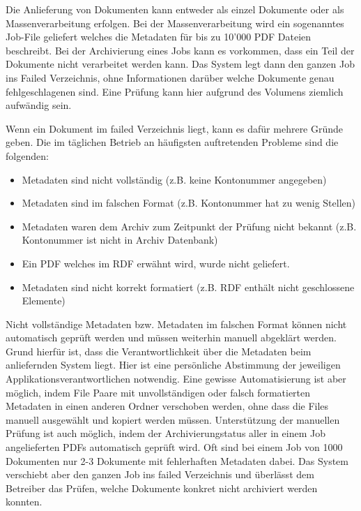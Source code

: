 \documentclass[a4paper,oneside, 12pt]{report}
\begin{document}
Die Anlieferung von Dokumenten kann entweder als einzel Dokumente oder als Massenverarbeitung erfolgen. Bei der Massenverarbeitung wird ein sogenanntes Job-File geliefert welches die Metadaten für bis zu 10'000 PDF Dateien beschreibt. Bei der Archivierung eines Jobs kann es vorkommen, dass ein Teil der Dokumente nicht verarbeitet werden kann. Das System legt dann den ganzen Job ins Failed Verzeichnis, ohne Informationen darüber welche Dokumente genau fehlgeschlagenen sind. Eine Prüfung kann hier aufgrund des Volumens ziemlich aufwändig sein.

Wenn ein Dokument im failed Verzeichnis liegt, kann es dafür mehrere Gründe geben. Die im täglichen Betrieb an häufigsten auftretenden Probleme sind die folgenden:
\begin{itemize}\itemsep=0.5pt
  \item Metadaten sind nicht vollständig  (z.B. keine Kontonummer angegeben)
  \item Metadaten sind im falschen Format (z.B. Kontonummer hat zu wenig Stellen)
  \item Metadaten waren dem Archiv zum Zeitpunkt der Prüfung nicht bekannt (z.B. Kontonummer ist nicht in Archiv Datenbank)
  \item Ein PDF welches im RDF erwähnt wird, wurde nicht geliefert.
  \item Metadaten sind nicht korrekt formatiert (z.B. RDF enthält nicht geschlossene Elemente)
\end{itemize}

Nicht vollständige Metadaten bzw. Metadaten im falschen Format können nicht automatisch geprüft werden und müssen weiterhin manuell abgeklärt werden. Grund hierfür ist, dass die Verantwortlichkeit über die Metadaten beim anliefernden System liegt. Hier ist eine persönliche Abstimmung der jeweiligen Applikationsverantwortlichen notwendig. Eine gewisse Automatisierung ist aber möglich, indem File Paare mit unvollständigen oder falsch formatierten Metadaten in einen anderen Ordner verschoben werden, ohne dass die Files manuell ausgewählt und kopiert werden müssen. Unterstützung der manuellen Prüfung ist auch möglich, indem der Archivierungstatus aller in einem Job angelieferten PDFs automatisch geprüft wird. Oft sind bei einem Job von 1000 Dokumenten nur 2-3 Dokumente mit fehlerhaften Metadaten dabei. Das System verschiebt aber den ganzen Job ins failed Verzeichnis und überlässt dem Betreiber das Prüfen, welche Dokumente konkret nicht archiviert werden konnten.
\end{document}
